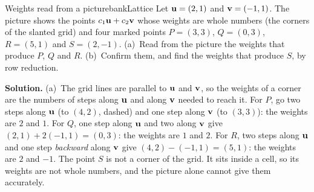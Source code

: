 \documentclass[11pt]{article}
\begin{document}
\begin{exmp}{Weights read from a picture}{bankLattice}
Let $\mathbf{u}=(2,1)$ and $\mathbf{v}=(-1,1)$. The picture shows the points $c_1\mathbf{u}+c_2\mathbf{v}$ whose weights are whole numbers (the corners of the slanted grid) and four marked points $P=(3,3)$, $Q=(0,3)$, $R=(5,1)$ and $S=(2,-1)$. (a)~Read from the picture the weights that produce $P$, $Q$ and $R$. (b)~Confirm them, and find the weights that produce $S$, by row reduction.

\begin{center}
\end{center}

\textbf{Solution.} (a)~The grid lines are parallel to $\mathbf{u}$ and $\mathbf{v}$, so the weights of a corner are the numbers of steps along $\mathbf{u}$ and along $\mathbf{v}$ needed to reach it. For $P$, go two steps along $\mathbf{u}$ (to $(4,2)$, dashed) and one step along $\mathbf{v}$ (to $(3,3)$): the weights are $2$ and $1$. For $Q$, one step along $\mathbf{u}$ and two along $\mathbf{v}$ give $(2,1)+2(-1,1)=(0,3)$: the weights are $1$ and $2$. For $R$, two steps along $\mathbf{u}$ and one step \emph{backward} along $\mathbf{v}$ give $(4,2)-(-1,1)=(5,1)$: the weights are $2$ and $-1$. The point $S$ is not a corner of the grid. It sits inside a cell, so its weights are not whole numbers, and the picture alone cannot give them accurately.


\end{exmp}
\end{document}
